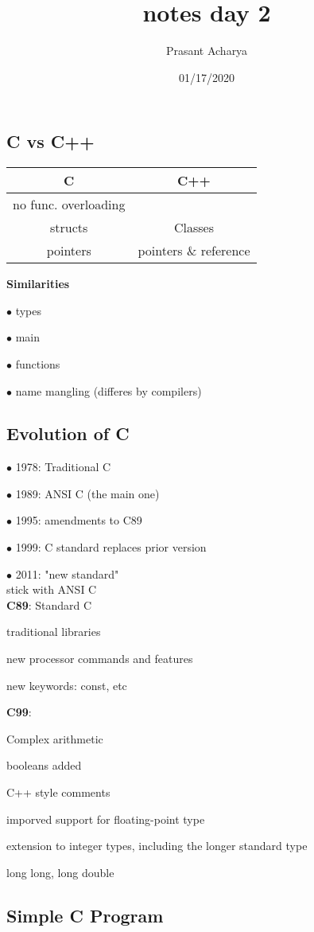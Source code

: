 \documentclass{article}
\title{notes day 2}
\author{Prasant Acharya}
\date{01/17/2020}
\begin{document}
\maketitle

\subsection{C vs C++}
\begin{tabular}{c|c}
C & C++ \\\hline
no func. overloading & \\\hline
structs & Classes \\\hline
pointers & pointers \& reference \\\hline
\end{tabular}
\textbf{Similarities}
\par
$\bullet$ types\par
$\bullet$ main\par
$\bullet$ functions\par
$\bullet$ name mangling (differes by compilers)\par

\subsection{Evolution of C}\par
$\bullet$ 1978: Traditional C\par
$\bullet$ 1989: ANSI C (the main one)\par
$\bullet$ 1995: amendments to C89\par
$\bullet$ 1999: C standard replaces prior version\par
$\bullet$ 2011: "new standard"\\
\newline
stick with ANSI C\\
\textbf{C89}: Standard C\par
traditional libraries\par
new processor commands and features\par
new keywords: const, etc\\\newline

\textbf{C99}: \par
Complex arithmetic\par
booleans added \par
C++ style comments \par
imporved support for floating-point type\par
extension to integer types, including the longer standard type\par\par
long long, long double\\\newline

\subsection{Simple C Program}
\end{document}
